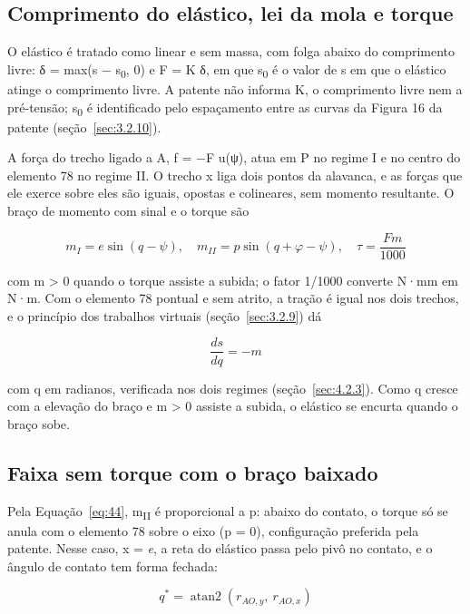 \subsection{Comprimento do elástico, lei da mola e torque}\label{sec:3.2.6}

O elástico é tratado como linear e sem massa, com folga abaixo do comprimento livre: δ = max(s − s\textsubscript{0}, 0) e F = K δ, em que s\textsubscript{0} é o valor de s em que o elástico atinge o comprimento livre. A patente não informa K, o comprimento livre nem a pré-tensão; s\textsubscript{0} é identificado pelo espaçamento entre as curvas da Figura 16 da patente (seção~\ref{sec:3.2.10}).

A força do trecho ligado a A, f = −F u(ψ), atua em P no regime I e no centro do elemento 78 no regime II. O trecho x liga dois pontos da alavanca, e as forças que ele exerce sobre eles são iguais, opostas e colineares, sem momento resultante. O braço de momento com sinal e o torque são

\begin{equation}
  m_{I} = e\sin{(q - \psi)},\quad m_{II} = p\sin{(q + \varphi - \psi)},\quad\tau = \frac{Fm}{1000}
  \label{eq:44}
\end{equation}

com m > 0 quando o torque assiste a subida; o fator 1/1000 converte N·mm em N·m. Com o elemento 78 pontual e sem atrito, a tração é igual nos dois trechos, e o princípio dos trabalhos virtuais (seção~\ref{sec:3.2.9}) dá

\begin{equation}
  \frac{ds}{dq} = - m
  \label{eq:45}
\end{equation}

com q em radianos, verificada nos dois regimes (seção~\ref{sec:4.2.3}). Como q cresce com a elevação do braço e m > 0 assiste a subida, o elástico se encurta quando o braço sobe.

\subsection{Faixa sem torque com o braço baixado}\label{sec:3.2.7}

Pela Equação~\eqref{eq:44}, m\textsubscript{II} é proporcional a p: abaixo do contato, o torque só se anula com o elemento 78 sobre o eixo (p = 0), configuração preferida pela patente. Nesse caso, x = \textit{e}, a reta do elástico passa pelo pivô no contato, e o ângulo de contato tem forma fechada:

\begin{equation}
  q^{*} = \operatorname{atan2}{(r_{AO,y},\ r_{AO,x})}
  \label{eq:46}
\end{equation}

